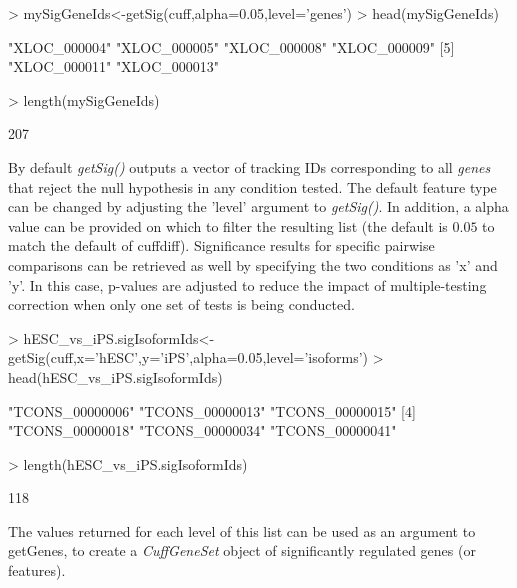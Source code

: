 \documentclass[10pt]{article}
\newcommand{\Rclass}[1]{{\textit{#1}}}
\newcommand{\Rmethod}[1]{{\textit{#1}}}
\begin{document}
\begin{Schunk}
\begin{Sinput}
> mySigGeneIds<-getSig(cuff,alpha=0.05,level='genes')
> head(mySigGeneIds)
\end{Sinput}
\begin{Soutput}
[1] "XLOC_000004" "XLOC_000005" "XLOC_000008" "XLOC_000009"
[5] "XLOC_000011" "XLOC_000013"
\end{Soutput}
\begin{Sinput}
> length(mySigGeneIds)
\end{Sinput}
\begin{Soutput}
[1] 207
\end{Soutput}
\end{Schunk}
By default \Rmethod{getSig()} outputs a vector of tracking IDs corresponding to all \emph{genes} that reject the null hypothesis in any condition tested. The default feature type can be changed by adjusting the 'level' argument to \Rmethod{getSig()}. In addition, a alpha value can be provided on which to filter the resulting list
(the default is $0.05$ to match the default of cuffdiff). Significance results for specific pairwise comparisons can be retrieved as well by specifying the two conditions as 'x' and 'y'. In this case, p-values are adjusted to reduce the impact of multiple-testing correction when only one set of tests is being conducted.

\begin{Schunk}
\begin{Sinput}
> hESC_vs_iPS.sigIsoformIds<-getSig(cuff,x='hESC',y='iPS',alpha=0.05,level='isoforms')
> head(hESC_vs_iPS.sigIsoformIds)
\end{Sinput}
\begin{Soutput}
[1] "TCONS_00000006" "TCONS_00000013" "TCONS_00000015"
[4] "TCONS_00000018" "TCONS_00000034" "TCONS_00000041"
\end{Soutput}
\begin{Sinput}
> length(hESC_vs_iPS.sigIsoformIds)
\end{Sinput}
\begin{Soutput}
[1] 118
\end{Soutput}
\end{Schunk}
The values returned for each level of this list can be used as an argument to getGenes, to create a \Rclass{CuffGeneSet} object of significantly regulated genes (or features).
\end{document}
